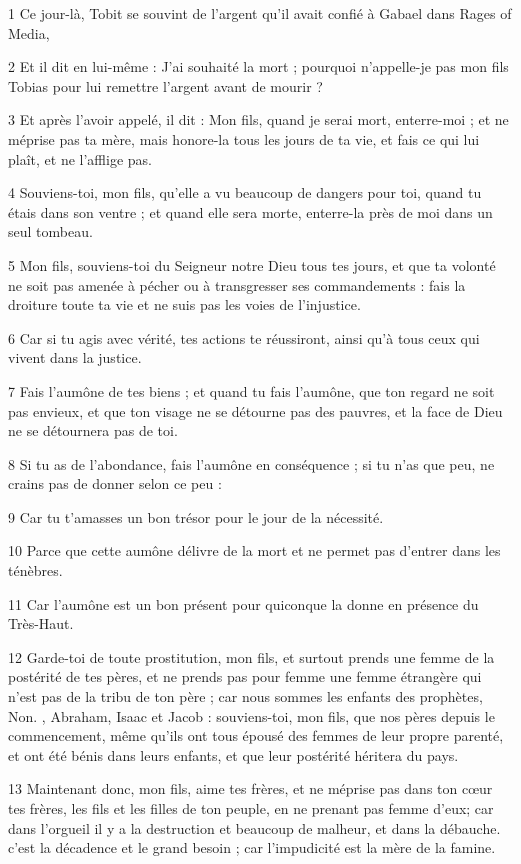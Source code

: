 \par 1 Ce jour-là, Tobit se souvint de l'argent qu'il avait confié à Gabael dans Rages of Media,
\par 2 Et il dit en lui-même : J'ai souhaité la mort ; pourquoi n'appelle-je pas mon fils Tobias pour lui remettre l'argent avant de mourir ?
\par 3 Et après l'avoir appelé, il dit : Mon fils, quand je serai mort, enterre-moi ; et ne méprise pas ta mère, mais honore-la tous les jours de ta vie, et fais ce qui lui plaît, et ne l'afflige pas.
\par 4 Souviens-toi, mon fils, qu'elle a vu beaucoup de dangers pour toi, quand tu étais dans son ventre ; et quand elle sera morte, enterre-la près de moi dans un seul tombeau.
\par 5 Mon fils, souviens-toi du Seigneur notre Dieu tous tes jours, et que ta volonté ne soit pas amenée à pécher ou à transgresser ses commandements : fais la droiture toute ta vie et ne suis pas les voies de l'injustice.
\par 6 Car si tu agis avec vérité, tes actions te réussiront, ainsi qu'à tous ceux qui vivent dans la justice.
\par 7 Fais l'aumône de tes biens ; et quand tu fais l'aumône, que ton regard ne soit pas envieux, et que ton visage ne se détourne pas des pauvres, et la face de Dieu ne se détournera pas de toi.
\par 8 Si tu as de l'abondance, fais l'aumône en conséquence ; si tu n'as que peu, ne crains pas de donner selon ce peu :
\par 9 Car tu t'amasses un bon trésor pour le jour de la nécessité.
\par 10 Parce que cette aumône délivre de la mort et ne permet pas d'entrer dans les ténèbres.
\par 11 Car l'aumône est un bon présent pour quiconque la donne en présence du Très-Haut.
\par 12 Garde-toi de toute prostitution, mon fils, et surtout prends une femme de la postérité de tes pères, et ne prends pas pour femme une femme étrangère qui n'est pas de la tribu de ton père ; car nous sommes les enfants des prophètes, Non. , Abraham, Isaac et Jacob : souviens-toi, mon fils, que nos pères depuis le commencement, même qu'ils ont tous épousé des femmes de leur propre parenté, et ont été bénis dans leurs enfants, et que leur postérité héritera du pays.
\par 13 Maintenant donc, mon fils, aime tes frères, et ne méprise pas dans ton cœur tes frères, les fils et les filles de ton peuple, en ne prenant pas femme d'eux; car dans l'orgueil il y a la destruction et beaucoup de malheur, et dans la débauche. c'est la décadence et le grand besoin ; car l'impudicité est la mère de la famine.
